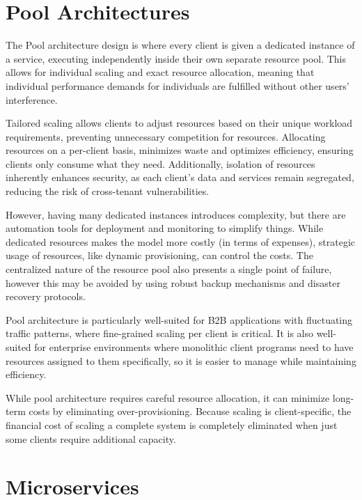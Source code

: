 \documentclass[]{final}
\begin{document}
\section{Pool Architectures}

The Pool architecture design is where every client is given a dedicated instance
of a service, executing independently inside their own separate resource pool.
This allows for individual scaling and exact resource allocation, meaning that
individual performance demands for individuals are fulfilled without other
users' interference.

Tailored scaling allows clients to adjust resources based on their unique
workload requirements, preventing unnecessary competition for resources.
Allocating resources on a per-client basis, minimizes waste and optimizes efficiency,
ensuring clients only consume what they need.
Additionally, isolation of resources inherently enhances security, as each client’s
data and services remain segregated, reducing the risk of cross-tenant
vulnerabilities.

However, having many dedicated instances introduces complexity, but there are automation
tools for deployment and monitoring to simplify things. While dedicated resources makes the model more
costly (in terms of expenses), strategic usage of resources, like dynamic provisioning, can control the costs. The
centralized nature of the resource pool also presents a single point of failure, however this may be
avoided by using robust backup mechanisms and disaster recovery protocols.

Pool architecture is particularly well-suited for B2B applications with
fluctuating traffic patterns,
where fine-grained scaling per client is critical. It is also well-suited
for enterprise environments where monolithic client programs need to have resources
assigned to them specifically, so it is easier to manage while maintaining efficiency.

While pool architecture requires careful resource allocation, it can minimize
long-term costs by eliminating over-provisioning. Because scaling is client-specific,
the financial cost of scaling a complete system is completely eliminated when just some
clients require additional capacity.

\section{Microservices}
\end{document}
